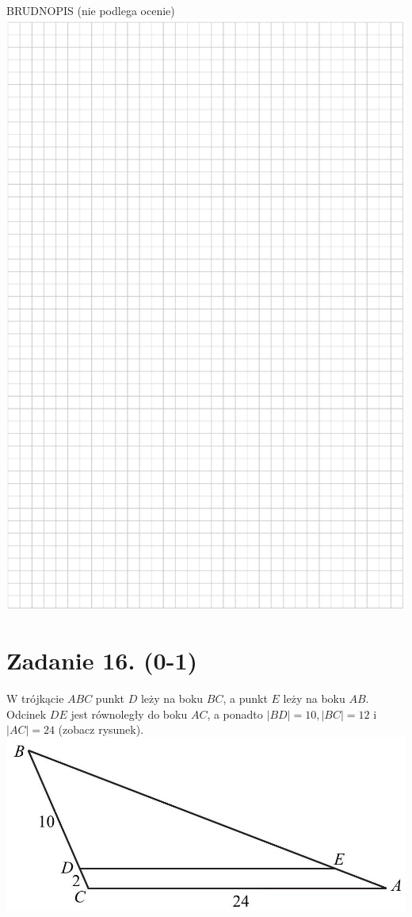 \documentclass[10pt]{article}
\begin{document}
BRUDNOPIS (nie podlega ocenie)\\
\includegraphics[max width=\textwidth, center]{2024_11_21_7b5527312ea89ae66fd0g-09}

\section*{Zadanie 16. (0-1)}
W trójkącie \(A B C\) punkt \(D\) leży na boku \(B C\), a punkt \(E\) leży na boku \(A B\). Odcinek \(D E\) jest równoległy do boku \(A C\), a ponadto \(|B D|=10,|B C|=12\) i \(|A C|=24\) (zobacz rysunek).\\
\includegraphics[max width=\textwidth, center]{2024_11_21_7b5527312ea89ae66fd0g-10}
\end{document}
